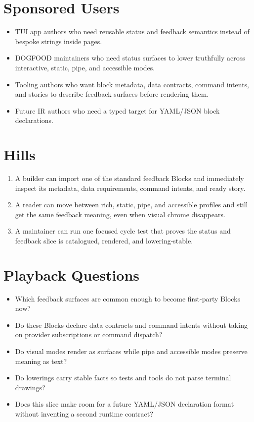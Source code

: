 \section{Sponsored Users}\label{record-092-sponsored-users}

\begin{itemize}
\tightlist
\item
  TUI app authors who need reusable status and feedback semantics instead of bespoke strings inside pages.
\item
  DOGFOOD maintainers who need status surfaces to lower truthfully across interactive, static, pipe, and accessible modes.
\item
  Tooling authors who want block metadata, data contracts, command intents, and stories to describe feedback surfaces before rendering them.
\item
  Future IR authors who need a typed target for YAML/JSON block declarations.
\end{itemize}

\section{Hills}\label{record-092-hills}

\begin{enumerate}
\def\labelenumi{\arabic{enumi}.}
\tightlist
\item
  A builder can import one of the standard feedback Blocks and immediately inspect its metadata, data requirements, command intents, and ready story.
\item
  A reader can move between rich, static, pipe, and accessible profiles and still get the same feedback meaning, even when visual chrome disappears.
\item
  A maintainer can run one focused cycle test that proves the status and feedback slice is catalogued, rendered, and lowering-stable.
\end{enumerate}

\section{Playback Questions}\label{record-092-playback-questions}

\begin{itemize}
\tightlist
\item
  Which feedback surfaces are common enough to become first-party Blocks now?
\item
  Do these Blocks declare data contracts and command intents without taking on provider subscriptions or command dispatch?
\item
  Do visual modes render as surfaces while pipe and accessible modes preserve meaning as text?
\item
  Do lowerings carry stable facts so tests and tools do not parse terminal drawings?
\item
  Does this slice make room for a future YAML/JSON declaration format without inventing a second runtime contract?
\end{itemize}

